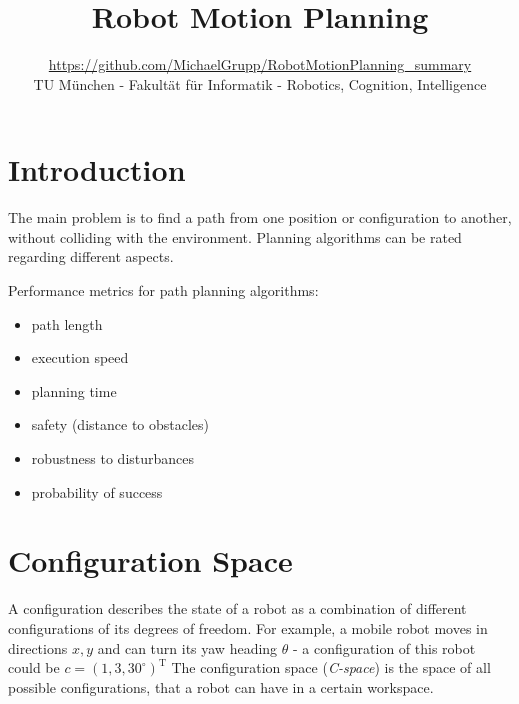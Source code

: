 
\graphicspath{{images/}}

\usepackage[
	colorlinks=true,
	urlcolor=blue,
	linkcolor=black
]{hyperref}

\title{Robot Motion Planning}
\author{\url{https://github.com/MichaelGrupp/RobotMotionPlanning_summary} \\ TU München - Fakultät für Informatik - Robotics, Cognition, Intelligence}
\date{\the\year}




\maketitle

\begin{multicols*}{2}  %


\section{Introduction}
The main problem is to find a path from one position or configuration to another, without colliding with the environment. Planning algorithms can be rated regarding different aspects.

Performance metrics for path planning algorithms: 
\begin{itemize}
	\item path length
	\item execution speed
	\item planning time
	\item safety (distance to obstacles)
	\item robustness to disturbances
	\item probability of success
\end{itemize}

\section{Configuration Space}

A configuration describes the state of a robot as a combination of different configurations of its degrees of freedom. For example, a mobile robot moves in directions $x,y$ and can turn its yaw heading $\theta$ - a configuration of this robot could be $c = (1,3,30^\circ)^\mathrm{T}$ The configuration space (\textit{C-space}) is the space of all possible configurations, that a robot can have in a certain workspace.


\end{multicols*}
